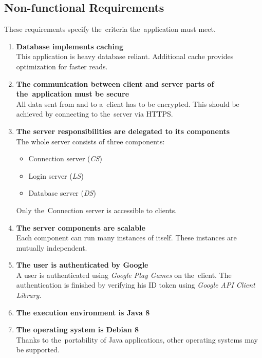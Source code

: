 	\subsection{Non-functional Requirements}
		These requirements specify the~criteria the~application must meet.
		\begin{enumerate}	
			\item \textbf{Database implements caching} \\
			This application is heavy database reliant. Additional cache provides optimization for faster reads. 				
			
			\item \textbf{The communication between client and server parts of the~application must be secure} \\
			All data sent from and to a~client has to be encrypted. This should be achieved by connecting to the~server via HTTPS.
	
			\item \textbf{The server responsibilities are delegated to its components} \\
			The whole server consists of three components:
			\begin{itemize}
				\item Connection server	(\textit{CS})							
				\item Login server (\textit{LS})
				\item Database server (\textit{DS})
			\end{itemize} 			
			Only the~Connection server is accessible to clients.
			
			\item \textbf{The server components are scalable} \\
			Each component can run many instances of itself. These instances are mutually independent.
			
			\item \textbf{The user is authenticated by Google} \\
			A user is authenticated using \textit{Google Play Games} \cite{gplaygames} on the~client. The authentication is finished by verifying his ID token using \textit{Google API Client Library}.	
			
			\item \textbf{The execution environment is Java 8}
								
			\item \textbf{The operating system is Debian 8}\\	
			Thanks to the~portability of Java applications, other operating systems may be supported. 														
		\end{enumerate}
	
